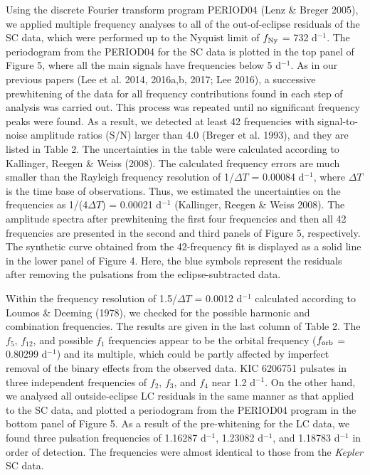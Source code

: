 \documentclass[useAMS,usenatbib,usegraphicx]{mn2e}
\begin{document}
Using the discrete Fourier transform program PERIOD04 (Lenz \& Breger 2005), we applied multiple frequency analyses to 
all of the out-of-eclipse residuals of the SC data, which were performed up to the Nyquist limit of 
$f_{\rm Ny}$ = 732 d$^{-1}$. The periodogram from the PERIOD04 for the SC data is plotted in the top panel of Figure 5, 
where all the main signals have frequencies below 5 d$^{-1}$. As in our previous papers (Lee et al. 2014, 2016a,b, 2017; 
Lee 2016), a successive prewhitening of the data for all frequency contributions found in each step of analysis was 
carried out. This process was repeated until no significant frequency peaks were found. As a result, we detected 
at least 42 frequencies with signal-to-noise amplitude ratios (S/N) larger than 4.0 (Breger et al. 1993), and they 
are listed in Table 2. The uncertainties in the table were calculated according to Kallinger, Reegen \& Weiss (2008). 
The calculated frequency errors are much smaller than the Rayleigh frequency resolution of 1/$\Delta T$ = 0.00084 d$^{-1}$, 
where $\Delta T$ is the time base of observations. Thus, we estimated the uncertainties on the frequencies as 1/(4$\Delta T$) 
= 0.00021 d$^{-1}$ (Kallinger, Reegen \& Weiss 2008). The amplitude spectra after prewhitening the first four frequencies 
and then all 42 frequencies are presented in the second and third panels of Figure 5, respectively. The synthetic curve 
obtained from the 42-frequency fit is displayed as a solid line in the lower panel of Figure 4. Here, the blue symbols 
represent the residuals after removing the pulsations from the eclipse-subtracted data. 

Within the frequency resolution of 1.5/$\Delta T$ = 0.0012 d$^{-1}$ calculated according to Loumos \& Deeming (1978), 
we checked for the possible harmonic and combination frequencies. The results are given in the last column of Table 2. 
The $f_5$, $f_{12}$, and possible $f_1$ frequencies appear to be the orbital frequency ($f_{\rm orb}$ = 0.80299 d$^{-1}$) 
and its multiple, which could be partly affected by imperfect removal of the binary effects from the observed data. 
KIC 6206751 pulsates in three independent frequencies of $f_2$, $f_3$, and $f_4$ near 1.2 d$^{-1}$. On the other hand, 
we analysed all outside-eclipse LC residuals in the same manner as that applied to the SC data, and plotted a periodogram 
from the PERIOD04 program in the bottom panel of Figure 5. As a result of the pre-whitening for the LC data, we found 
three pulsation frequencies of 1.16287 d$^{-1}$, 1.23082 d$^{-1}$, and 1.18783 d$^{-1}$ in order of detection. 
The frequencies were almost identical to those from the {\it Kepler} SC data.
\end{document}

